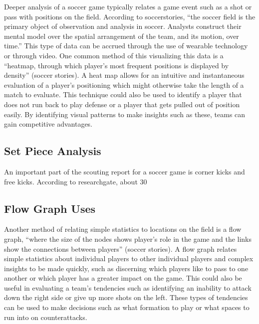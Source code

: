 \documentclass[sigconf]{acmart}
\begin{document}
Deeper analysis of a soccer game typically relates a game event such as a shot or pass with positions on the field. According to soccerstories, “the soccer field is the primary object of observation and analysis in soccer. Analysts construct their mental model over the spatial arrangement of the team, and its motion, over time.” This type of data can be accrued through the use of wearable technology or through video. One common method of this visualizing this data is a “heatmap, through which player's most frequent positions is displayed by density” (soccer stories). A heat map allows for an intuitive and instantaneous evaluation of a player’s positioning which might otherwise take the length of a match to evaluate. This technique could also be used to identify a player that does not run back to play defense or a player that gets pulled out of position easily. By identifying visual patterns to make insights such as these, teams can gain competitive advantages.

\subsection{Set Piece Analysis}

An important part of the scouting report for a soccer game is corner kicks and free kicks. According to researchgate,  about 30%

\subsection{Flow Graph Uses}

Another method of relating simple statistics to locations on the field is a flow graph, “where the size of the nodes shows player's role in the game and the links show the connections between players” (soccer stories). A flow graph relates simple statistics about individual players to other individual players and complex insights to be made quickly, such as discerning which players like to pass to one another or which player has a greater impact on the game. This could also be useful in evaluating a team’s tendencies such as identifying an inability to attack down the right side or give up more shots on the left. These types of tendencies can be used to make decisions such as what formation to play or what spaces to run into on counterattacks.
\end{document}
